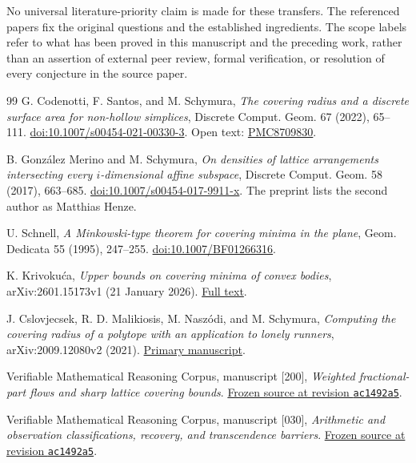 \documentclass[11pt,a4paper]{article}
\theoremstyle{remark}\newtheorem{remark}[theorem]{Remark}
\begin{document}
No universal literature-priority claim is made for these transfers.
The referenced papers fix the original questions and the established
ingredients. The scope labels refer to what has been proved in this
manuscript and the preceding work, rather than an assertion of external
peer review, formal verification, or resolution of every conjecture
in the source paper.

\begin{thebibliography}{99}
G. Codenotti, F. Santos, and M. Schymura,
\emph{The covering radius and a discrete surface area for non-hollow
simplices}, Discrete Comput. Geom. 67 (2022), 65--111.
\href{https://doi.org/10.1007/s00454-021-00330-3}{doi:10.1007/s00454-021-00330-3}.
Open text: \href{https://pmc.ncbi.nlm.nih.gov/articles/PMC8709830/}{PMC8709830}.

B. Gonz\'alez Merino and M. Schymura,
\emph{On densities of lattice arrangements intersecting every
$i$-dimensional affine subspace}, Discrete Comput. Geom. 58
(2017), 663--685.
\href{https://doi.org/10.1007/s00454-017-9911-x}{doi:10.1007/s00454-017-9911-x}.
The preprint lists the second author as Matthias Henze.

U. Schnell, \emph{A Minkowski-type theorem for covering minima
in the plane}, Geom. Dedicata 55 (1995), 247--255.
\href{https://doi.org/10.1007/BF01266316}{doi:10.1007/BF01266316}.

K. Krivoku\'ca, \emph{Upper bounds on covering minima of convex bodies},
arXiv:2601.15173v1 (21 January 2026).
\href{https://arxiv.org/html/2601.15173v1}{Full text}.

J. Cslovjecsek, R. D. Malikiosis, M. Nasz\'odi, and M. Schymura,
\emph{Computing the covering radius of a polytope with an application
to lonely runners}, arXiv:2009.12080v2 (2021).
\href{https://real.mtak.hu/152905/1/2009.12080.pdf}{Primary manuscript}.


Verifiable Mathematical Reasoning Corpus, manuscript [200], \emph{Weighted fractional-part flows and sharp lattice covering bounds}. 
\href{https://github.com/QEEDDD/Verifiable-Mathematical-Reasoning-Corpus/blob/ac1492a50784be919fe0b5e8f19f96f8d221a22e/\%5B200\%5D\%20lattice_covering_flows.tex}{Frozen source at revision \texttt{ac1492a5}}.

Verifiable Mathematical Reasoning Corpus, manuscript [030], \emph{Arithmetic and observation classifications, recovery, and transcendence barriers}. 
\href{https://github.com/QEEDDD/Verifiable-Mathematical-Reasoning-Corpus/blob/ac1492a50784be919fe0b5e8f19f96f8d221a22e/\%5B030\%5D\%20Arithmetic\%20and\%20Observation\%20Classifications\%2C\%20Recovery\%2C\%20and\%20Transcendence\%20Barriers.tex}{Frozen source at revision \texttt{ac1492a5}}.


\end{thebibliography}
\end{document}
